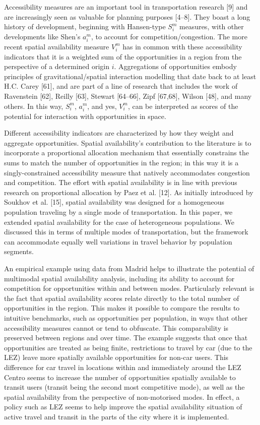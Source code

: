 \documentclass[10pt,letterpaper]{article}
\begin{document}
Accessibility measures are an important tool in transportation research
{[}9{]} and are increasingly seen as valuable for planning purposes
{[}4--8{]}. They boast a long history of development, beginning with
Hansen-type \(S_i^m\) measures, with other developments like Shen's
\(a_i^m\), to account for competition/congestion. The more recent
spatial availability measure \(V_i^m\) has in common with these
accessibility indicators that it is a weighted sum of the opportunities
in a region from the perspective of a determined origin \(i\).
Aggregations of opportunities embody principles of gravitational/spatial
interaction modelling that date back to at least H.C. Carey {[}61{]},
and are part of a line of research that includes the work of Ravenstein
{[}62{]}, Reilly {[}63{]}, Stewart {[}64--66{]}, Zipf {[}67,68{]},
Wilson {[}48{]}, and many others. In this way, \(S_i^m\), \(a_i^m\), and
yes, \(V_i^m\), can be interpreted as scores of the potential for
interaction with opportunities in space.

Different accessibility indicators are characterized by how they weight
and aggregate opportunities. Spatial availability's contribution to the
literature is to incorporate a proportional allocation mechanism that
essentially constrains the sums to match the number of opportunities in
the region; in this way it is a singly-constrained accessibility measure
that natively accommodates congestion and competition. The effort with
spatial availability is in line with previous research on proportional
allocation by Paez et al. {[}12{]}. As initially introduced by Soukhov
et al. {[}15{]}, spatial availability was designed for a homogeneous
population traveling by a single mode of transportation. In this paper,
we extended spatial availability for the case of heterogeneous
populations. We discussed this in terms of multiple modes of
transportation, but the framework can accommodate equally well
variations in travel behavior by population segments.

An empirical example using data from Madrid helps to illustrate the
potential of multimodal spatial availability analysis, including its
ability to account for competition for opportunities within and between
modes. Particularly relevant is the fact that spatial availability
scores relate directly to the total number of opportunities in the
region. This makes it possible to compare the results to intuitive
benchmarks, such as opportunities per population, in ways that other
accessibility measures cannot or tend to obfuscate. This comparability
is preserved between regions and over time. The example suggests that
once that opportunities are treated as being finite, restrictions to
travel by car (due to the LEZ) leave more spatially available
opportunities for non-car users. This difference for car travel in
locations within and immediately around the LEZ Centro seems to increase
the number of opportunities spatially available to transit users
(transit being the second most competitive mode), as well as the spatial
availability from the perspective of non-motorised modes. In effect, a
policy such as LEZ seems to help improve the spatial availability
situation of active travel and transit in the parts of the city where it
is implemented.
\end{document}
